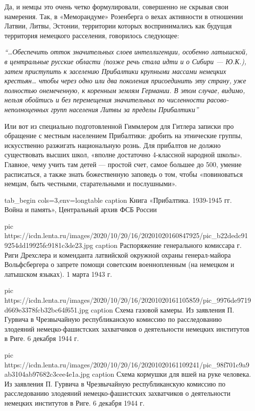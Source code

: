 Да, и немцы это очень четко формулировали, совершенно не скрывая свои
намерения. Так, в «Меморандуме» Розенберга о вехах активности в отношении
Латвии, Литвы, Эстонии, территории которых воспринимались как будущая
территория немецкого расселения, говорилось следующее:

\begin{leftbar}
				\em
				\enquote{…Обеспечить отток значительных слоев интеллигенции, особенно латышской, в
центральные русские области (позже речь стала идти и о Сибири — Ю.К.),
затем приступить к заселению Прибалтики крупными массами немецких
крестьян… чтобы через одно или два поколения присоединить эту страну,
уже полностью онемеченную, к коренным землям Германии. В этом случае,
видимо, нельзя обойтись и без перемещения значительных по численности
				расово-неполноценных групп населения Литвы за пределы Прибалтики}
\end{leftbar}

Или вот из специально подготовленной Гиммлером для Гитлера записки про
обращение с местным населением Прибалтики: дробить на этнические группы,
искусственно разжигать национальную рознь. Для прибалтов не должно существовать
высших школ, «вполне достаточно 4-классной народной школы». Главное, чему учить
там детей — простой счет, самое большее до 500, умение расписаться, а также
знать божественную заповедь о том, чтобы «повиноваться немцам, быть честными,
старательными и послушными».

\ifcmt
tab_begin cols=3,env=longtable
	caption Книга «Прибалтика. 1939-1945 гг. Война и память», Центральный архив ФСБ России

	pic https://icdn.lenta.ru/images/2020/10/20/16/20201020160847925/pic_b22dedc919254dd19925fc9181c3de23.jpg
	caption Распоряжение генерального комиссара г. Риги Дрехслера и коменданта латвийской окружной охраны генерал-майора Вольфсбергера о запрете помощи советским военнопленным (на немецком и латышском языках). 1 марта 1943 г.

	pic https://icdn.lenta.ru/images/2020/10/20/16/20201020161105859/pic_9976de9719d669e3378fcb32bc64f651.jpg
	caption Схема газовой камеры. Из заявления П. Гурвича в Чрезвычайную республиканскую комиссию по расследованию злодеяний немецко-фашистских захватчиков о деятельности немецких институтов в Риге. 6 декабря 1944 г.

	pic https://icdn.lenta.ru/images/2020/10/20/16/20201020161109241/pic_98f701c9a9ab3104ab97682c3cee4e1a.jpg
	caption Схема кормушки для вшей на руке человека. Из заявления П. Гурвича в Чрезвычайную республиканскую комиссию по расследованию злодеяний немецко-фашистских захватчиков о деятельности немецких институтов в Риге. 6 декабря 1944 г.
\fi

